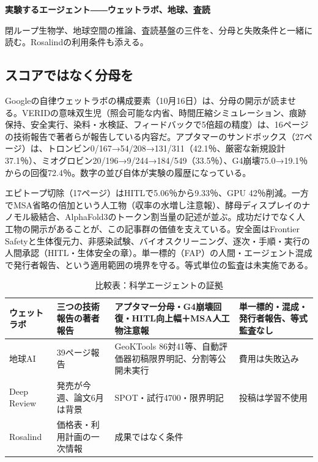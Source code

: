 \documentclass[lualatex,a4paper,10pt]{jlreq}
\begin{document}
{\Large\bfseries 実験するエージェント――ウェットラボ、地球、査読\par}
\smallskip
{\color{SurveyMuted}閉ループ生物学、地球空間の推論、査読基盤の三件を、分母と失敗条件と一緒に読む。Rosalindの利用条件も添える。\par}
\bigskip

\subsection*{スコアではなく分母を}

Googleの自律ウェットラボの構成要素（10月16日）は、分母の開示が読ませる。VERIDの意味双生児（照会可能な内省、時間圧縮シミュレーション、痕跡保持、安全実行、染料・水検証、フィードバックで5倍超の精度）は、16ページの技術報告で著者らが報告している内容だ。アプタマーのサンドボックス（27ページ）は、トロンビン0/167→54/208→131/311（42.1％、厳密な新規設計37.1％）、ミオグロビン20/196→9/244→184/549（33.5％）、G4崩壊75.0→19.1％からの回復72.4％。数字の並び自体が実験の履歴になっている。
\cite{B46,B83,B44,B43,B45}


エピトープ切除（17ページ）はHITLで5.06％から9.33％、GPU 42％削減。一方でMSA省略の倍加という人工物（収率の水増し注意報）、酵母ディスプレイのナノモル級結合、AlphaFold3のトークン割当量の記述が並ぶ。成功だけでなく人工物の開示があることが、この記事群の価値を支えている。安全面はFrontier Safetyと生体復元力、非感染試験、バイオスクリーニング、逐次・手順・実行の人間承認（HITL・生体安全の章）。単一標的（FAP）の人間・エージェント混成で発行者報告、という適用範囲の境界を守る。等式単位の監査は未実施である。
\cite{B46,B83,B44,B43,B45}


\begin{table}[htbp]\centering\footnotesize
\caption{比較表：科学エージェントの証拠}
\begin{tabularx}{0.96\linewidth}{@{}lXXX@{}}
\toprule
ウェットラボ & 三つの技術報告の著者報告 & アプタマー分母・G4崩壊回復・HITL向上幅＋MSA人工物注意報 & 単一標的・混成・発行者報告、等式監査なし \cite{B46,B83,B44,B43} \\
\midrule
地球AI & 39ページ報告 & GeoKTools 86対41等、自動評価器初稿限界明記、分割等公開未実行 & 費用は失敗込み \cite{B47,B84,B48} \\
\midrule
Deep Review & 発売が今週、論文6月は背景 & SPOT・試行4700・限界明記 & 投稿は学習不使用 \cite{B50,B85,B49} \\
\midrule
Rosalind & 価格表・利用計画の一次情報 & 成果ではなく条件 \cite{B51,B86} \\
\bottomrule
\end{tabularx}
\end{table}
\end{document}
